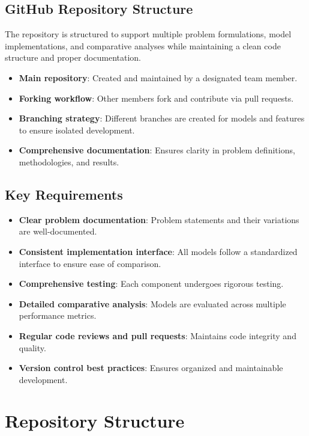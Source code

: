 \subsection{GitHub Repository Structure}

The repository is structured to support multiple problem formulations, model implementations, and comparative analyses while maintaining a clean code structure and proper documentation.

\begin{itemize}
    \item \textbf{Main repository}: Created and maintained by a designated team member.
    \item \textbf{Forking workflow}: Other members fork and contribute via pull requests.
    \item \textbf{Branching strategy}: Different branches are created for models and features to ensure isolated development.
    \item \textbf{Comprehensive documentation}: Ensures clarity in problem definitions, methodologies, and results.
\end{itemize}

\subsection{Key Requirements}

\begin{itemize}
    \item \textbf{Clear problem documentation}: Problem statements and their variations are well-documented.
    \item \textbf{Consistent implementation interface}: All models follow a standardized interface to ensure ease of comparison.
    \item \textbf{Comprehensive testing}: Each component undergoes rigorous testing.
    \item \textbf{Detailed comparative analysis}: Models are evaluated across multiple performance metrics.
    \item \textbf{Regular code reviews and pull requests}: Maintains code integrity and quality.
    \item \textbf{Version control best practices}: Ensures organized and maintainable development.
\end{itemize}

\section{Repository Structure}

